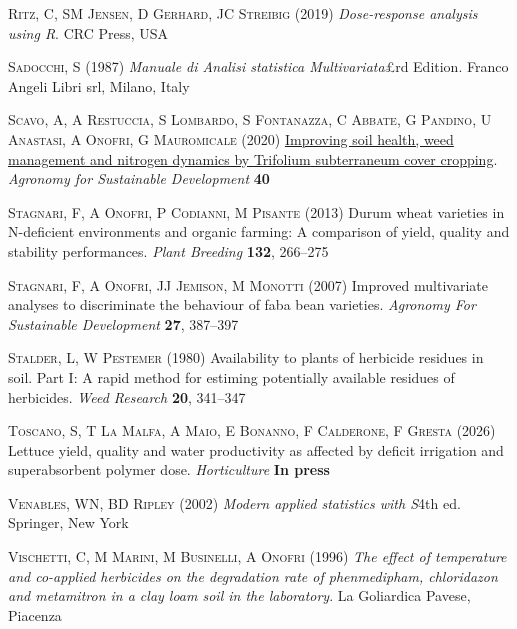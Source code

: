 \documentclass[
  letterpaper,
  DIV=11,
  numbers=noendperiod]{scrreprt}
\newlength{\cslhangindent}
\newenvironment{CSLReferences}[2] %
 {\begin{list}{}{%
  \setlength{\itemindent}{0pt}
  \setlength{\leftmargin}{0pt}
  \setlength{\parsep}{0pt}
  \ifodd #1
   \setlength{\leftmargin}{\cslhangindent}
   \setlength{\itemindent}{-1\cslhangindent}
  \fi
  \setlength{\itemsep}{#2\baselineskip}}}
 {\end{list}}
\begin{document}
\begin{CSLReferences}{1}{0}
\textsc{Ritz, C, SM Jensen, D Gerhard, JC Streibig} (2019)
\emph{Dose-response analysis using {R}}. CRC Press, USA

\textsc{Sadocchi, S} (1987) \emph{Manuale di {Analisi} statistica
{Multivariata}}£rd Edition. Franco Angeli Libri srl, Milano, Italy

\textsc{Scavo, A, A Restuccia, S Lombardo, S Fontanazza, C Abbate, G
Pandino, U Anastasi, A Onofri, G Mauromicale} (2020)
\href{https://doi.org/10.1007/s13593-020-00621-8}{Improving soil health,
weed management and nitrogen dynamics by {Trifolium} subterraneum cover
cropping}. \emph{Agronomy for Sustainable Development} \textbf{40}

\textsc{Stagnari, F, A Onofri, P Codianni, M Pisante} (2013) Durum wheat
varieties in {N}-deficient environments and organic farming: A
comparison of yield, quality and stability performances. \emph{Plant
Breeding} \textbf{132}, 266--275

\textsc{Stagnari, F, A Onofri, JJ Jemison, M Monotti} (2007) Improved
multivariate analyses to discriminate the behaviour of faba bean
varieties. \emph{Agronomy For Sustainable Development} \textbf{27},
387--397

\textsc{Stalder, L, W Pestemer} (1980) Availability to plants of
herbicide residues in soil. {Part} {I}: {A} rapid method for estiming
potentially available residues of herbicides. \emph{Weed Research}
\textbf{20}, 341--347

\textsc{Toscano, S, T La Malfa, A Maio, E Bonanno, F Calderone, F
Gresta} (2026) Lettuce yield, quality and water productivity as affected
by deficit irrigation and superabsorbent polymer dose.
\emph{Horticulture} \textbf{In press}

\textsc{Venables, WN, BD Ripley} (2002) \emph{Modern applied statistics
with {S}}4th ed. Springer, New York

\textsc{Vischetti, C, M Marini, M Businelli, A Onofri} (1996) \emph{The
effect of temperature and co-applied herbicides on the degradation rate
of phenmedipham, chloridazon and metamitron in a clay loam soil in the
laboratory}. La Goliardica Pavese, Piacenza


\end{CSLReferences}
\end{document}
